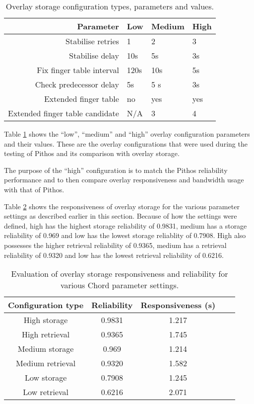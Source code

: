 \begin{table}[htbp]
\centering
\begin{tabular}{|r|l|l|l|}
\hline
Parameter                       & Low  & Medium & High  \\
\hline
Stabilise retries               & 1    & 2      &  3    \\
Stabilise delay                 & 10s  & 5s     &  3s   \\
Fix finger table interval       & 120s & 10s    &  5s   \\
Check predecessor delay         & 5s   & 5 s    &  3s   \\
Extended finger table           & no   & yes    &  yes  \\
Extended finger table candidate & N/A  & 3      &  4    \\
\hline
\end{tabular}
\caption{Overlay storage configuration types, parameters and values.}
\label{tab_overlay_configs}
\end{table}

Table \ref{tab_overlay_configs} shows the ``low'', ``medium'' and ``high'' overlay configuration parameters and their values. These are the overlay configurations that were used during the testing of Pithos and its comparison with overlay storage.

The purpose of the ``high'' configuration is to match the Pithos reliability performance and to then compare overlay responsiveness and bandwidth usage with that of Pithos.

Table \ref{tab_overlay_rel_resp_results} shows the responsiveness of overlay storage for the various parameter settings as described earlier in this section. Because of how the settings were defined, high has the highest storage reliability of 0.9831, medium has a storage reliability of 0.969 and low has the lowest storage reliablity of 0.7908. High also possesses the higher retrieval reliability of 0.9365, medium has a retrieval reliability of 0.9320 and low has the lowest retrieval reliability of 0.6216.
%
\begin{table}[htbp]
\centering
\begin{tabular}{|c|c|c|c|c|}
\hline
Configuration type & Reliability & Responsiveness (s)\\
\hline
High storage     &   0.9831      &   1.217  \\
High retrieval   &   0.9365      &   1.745  \\
Medium storage   &   0.969       &   1.214  \\
Medium retrieval &   0.9320      &   1.582  \\
Low storage      &   0.7908      &   1.245  \\
Low retrieval    &   0.6216      &   2.071  \\
\hline
\end{tabular}
\caption{Evaluation of overlay storage responsiveness and reliability for various Chord parameter settings.}
\label{tab_overlay_rel_resp_results}
\end{table}

